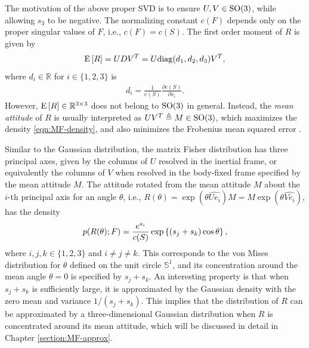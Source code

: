 The motivation of the above proper SVD is to ensure $U,V\in\mathrm{SO}(3)$, while allowing $s_3$ to be negative.
The normalizing constant $c(F)$ depends only on the proper singular values of $F$, i.e., $c(F) = c(S)$.
The first order moment of $R$ is given by 
\begin{gather} \label{eqn:MF-ER}
	\mathrm{E}\left[ R \right] = UDV^T = U\mathrm{diag}(d_1,d_2,d_3)V^T,
\end{gather}
where $d_i\in\mathbb{R}$ for $i\in\{1,2,3\}$ is
\begin{gather} \label{eqn:MF-S2D}
	d_i = \frac{1}{c(S)} \frac{\partial c(S)}{\partial s_i}.
\end{gather}
However, $\mathrm{E}\left[ R \right]\in\mathbb{R}^{3\times 3}$  does not belong to $\mathrm{SO}(3)$ in general. 
Instead, the \textit{mean attitude} of $R$ is usually interpreted as $UV^T \triangleq M\in\mathrm{SO}(3)$, which maximizes the density \eqref{eqn:MF-density}, and also minimizes the Frobenius mean squared error \cite{lee2018bayesian}. 

Similar to the Gaussian distribution, the matrix Fisher distribution has three principal axes, given by the columns of $U$ resolved in the inertial frame, or equivalently the columns of $V$ when resolved in the body-fixed frame specified by the mean attitude $M$.
The attitude rotated from the mean attitude $M$ about the $i$-th principal axis for an angle $\theta$, i.e., $R(\theta) = \exp(\theta\widehat{Ue_i})M = M\exp(\theta\widehat{Ve_i})$, has the density
\begin{equation} \label{eqn:MF-density-principal}
	p(R(\theta);F) = \frac{e^{s_i}}{c(S)}\exp\left\{ (s_j+s_k)\cos\theta \right\},
\end{equation}
where $i,j,k\in\{1,2,3\}$ and $i\neq j\neq k$.
This corresponds to the von Mises distribution for $\theta$ defined on the unit circle $\mathbb{S}^1$, and its concentration around the mean angle $\theta=0$ is specified by $s_j+s_k$.
An interesting property is that when $s_j+s_k$ is sufficiently large, it is approximated by the Gaussian density with the zero mean and variance $1/(s_j+s_k)$.
This implies that the distribution of $R$ can be approximated by a three-dimensional Gaussian distribution when $R$ is concentrated around its mean attitude, which will be discussed in detail in Chapter \ref{section:MF-approx}.

